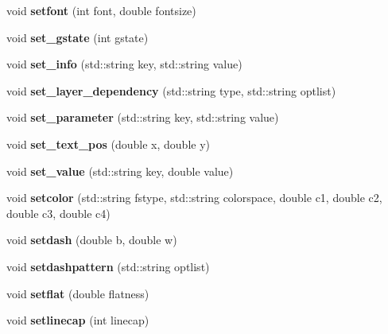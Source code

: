 \begin{DoxyCompactItemize}
void {\bfseries setfont} (int font, double fontsize)
\item 
\hypertarget{classPDFlib_ac40b1d868fb9430800c46667f49e16ff}{}\label{classPDFlib_ac40b1d868fb9430800c46667f49e16ff} 
void {\bfseries set\+\_\+gstate} (int gstate)
\item 
\hypertarget{classPDFlib_a1679bc2cdc767964fe19993032704c65}{}\label{classPDFlib_a1679bc2cdc767964fe19993032704c65} 
void {\bfseries set\+\_\+info} (std\+::string key, std\+::string value)
\item 
\hypertarget{classPDFlib_a3bf3c45ea844c50c81d1e6d1a399f7cf}{}\label{classPDFlib_a3bf3c45ea844c50c81d1e6d1a399f7cf} 
void {\bfseries set\+\_\+layer\+\_\+dependency} (std\+::string type, std\+::string optlist)
\item 
\hypertarget{classPDFlib_abced8a3b9223a00e6a9fbf13aa2cf488}{}\label{classPDFlib_abced8a3b9223a00e6a9fbf13aa2cf488} 
void {\bfseries set\+\_\+parameter} (std\+::string key, std\+::string value)
\item 
\hypertarget{classPDFlib_a68aaa2b104cbeff66f28478c5503b71c}{}\label{classPDFlib_a68aaa2b104cbeff66f28478c5503b71c} 
void {\bfseries set\+\_\+text\+\_\+pos} (double x, double y)
\item 
\hypertarget{classPDFlib_a5fbc3e6d8843291ada8fabe40a106caf}{}\label{classPDFlib_a5fbc3e6d8843291ada8fabe40a106caf} 
void {\bfseries set\+\_\+value} (std\+::string key, double value)
\item 
\hypertarget{classPDFlib_a45fca2a5dce286baa78e2394d83baa6f}{}\label{classPDFlib_a45fca2a5dce286baa78e2394d83baa6f} 
void {\bfseries setcolor} (std\+::string fstype, std\+::string colorspace, double c1, double c2, double c3, double c4)
\item 
\hypertarget{classPDFlib_a45e9138f953e972ab2f09f076d105c7b}{}\label{classPDFlib_a45e9138f953e972ab2f09f076d105c7b} 
void {\bfseries setdash} (double b, double w)
\item 
\hypertarget{classPDFlib_a54c49fec034612feaf38fad5df9f76b7}{}\label{classPDFlib_a54c49fec034612feaf38fad5df9f76b7} 
void {\bfseries setdashpattern} (std\+::string optlist)
\item 
\hypertarget{classPDFlib_a305e47f39351bc587c78c90cc4edabba}{}\label{classPDFlib_a305e47f39351bc587c78c90cc4edabba} 
void {\bfseries setflat} (double flatness)
\item 
\hypertarget{classPDFlib_a60623dfccc99a7fd09b12c9b585092db}{}\label{classPDFlib_a60623dfccc99a7fd09b12c9b585092db} 
void {\bfseries setlinecap} (int linecap)
\item 

\end{DoxyCompactItemize}

